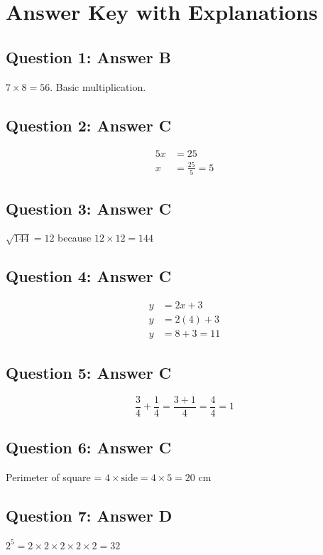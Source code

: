 \documentclass[12pt]{article}
\begin{document}
\section*{Answer Key with Explanations}

\subsection*{Question 1: Answer B}
$7 \times 8 = 56$. Basic multiplication.

\subsection*{Question 2: Answer C}
\begin{align*}
    5x &= 25 \\
    x &= \frac{25}{5} = 5
\end{align*}

\subsection*{Question 3: Answer C}
$\sqrt{144} = 12$ because $12 \times 12 = 144$

\subsection*{Question 4: Answer C}
\begin{align*}
    y &= 2x + 3 \\
    y &= 2(4) + 3 \\
    y &= 8 + 3 = 11
\end{align*}

\subsection*{Question 5: Answer C}
$$\frac{3}{4} + \frac{1}{4} = \frac{3+1}{4} = \frac{4}{4} = 1$$

\subsection*{Question 6: Answer C}
Perimeter of square = $4 \times \text{side} = 4 \times 5 = 20$ cm

\subsection*{Question 7: Answer D}
$2^5 = 2 \times 2 \times 2 \times 2 \times 2 = 32$
\end{document}
